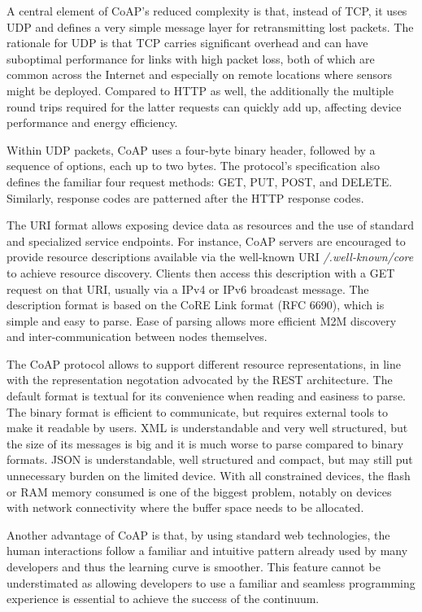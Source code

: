 A central element of CoAP's reduced complexity is that, instead of TCP, it uses UDP and defines a very simple message layer for retransmitting lost packets. The rationale for UDP is that TCP carries significant overhead and can have suboptimal performance for links with high packet loss, both of which are common across the Internet \cite{akamai} and especially on remote locations where sensors might be deployed. Compared to HTTP as well, the additionally the multiple round trips required for the latter requests can quickly add up, affecting device performance and energy efficiency.

Within UDP packets, CoAP uses a four-byte binary header, followed by a sequence of options, each up to two bytes. The protocol's specification also defines the familiar four request methods: GET, PUT, POST, and DELETE. Similarly, response codes are patterned after the HTTP response codes.

The URI format allows exposing device data as resources and the use of standard and specialized service endpoints. For instance, CoAP servers are encouraged to provide resource descriptions available via the well-known URI \emph{/.well-known/core} to achieve resource discovery. Clients then access this description with a GET request on that URI, usually via a IPv4 or IPv6 broadcast message. The description format is based on the CoRE Link format (RFC 6690), which is simple and easy to parse. Ease of parsing allows more efficient M2M discovery and inter-communication between nodes themselves.

The CoAP protocol allows to support different resource representations, in line with the representation negotation advocated by the REST architecture. The default format is textual for its convenience when reading and easiness to parse. The binary format is efficient to communicate, but requires external tools to make it readable by users. XML is understandable and very well structured, but the size of its messages is big and it is much worse to parse compared to binary formats. JSON is understandable, well structured and compact, but may still put unnecessary burden on the limited device. With all constrained devices, the flash or RAM memory consumed is one of the biggest problem, notably on devices with network connectivity where the buffer space needs to be allocated.

Another advantage of CoAP is that, by using standard web technologies, the human interactions follow a familiar and intuitive pattern already used by many developers and thus the learning curve is smoother. This feature cannot be understimated as allowing developers to use a familiar and seamless programming experience is essential to achieve the success of the continuum.

